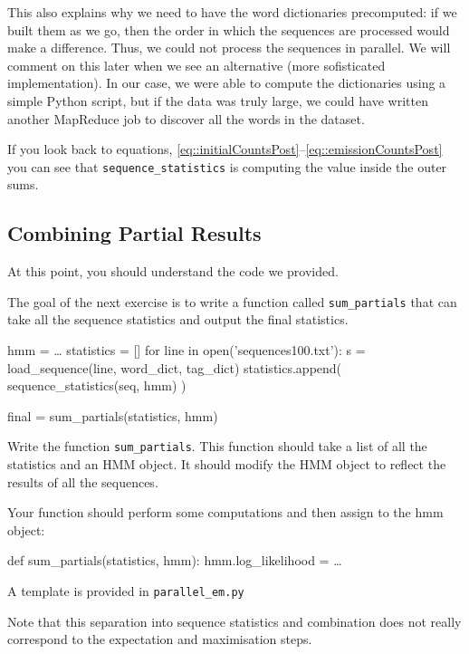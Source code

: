 This also explains why we need to have the word dictionaries precomputed: if we
built them as we go, then the order in which the sequences are processed would
make a difference. Thus, we could not process the sequences in parallel. We
will comment on this later when we see an alternative (more sofisticated
implementation). In our case, we were able to compute the dictionaries using a
simple Python script, but if the data was truly large, we could have written
another MapReduce job to discover all the words in the dataset.

If you look back to equations,
\eqref{eq::initialCountsPost}--\eqref{eq::emissionCountsPost} you can see that
\verb+sequence_statistics+ is computing the value inside the outer sums.

\subsection{Combining Partial Results}
At this point, you should understand the code we provided.

The goal of the next exercise is to write a function called \verb+sum_partials+
that can take all the sequence statistics and output the final statistics.

\begin{python}
hmm = \ldots
statistics = []
for line in open('sequences100.txt'):
    s = load_sequence(line, word_dict, tag_dict)
    statistics.append(
        sequence_statistics(seq, hmm)
        )

final = sum_partials(statistics, hmm)
\end{python}

\begin{exercise}
Write the function \verb+sum_partials+. This function should take a list of all
the statistics and an HMM object. It should modify the HMM object to reflect
the results of all the sequences.

Your function should perform some computations and then assign to the hmm object:

\begin{python}
def sum_partials(statistics, hmm):
    hmm.log_likelihood = \ldots
\end{python}

A template is provided in \verb+parallel_em.py+
\end{exercise}

Note that this separation into sequence statistics and combination does not
really correspond to the expectation and maximisation steps.

